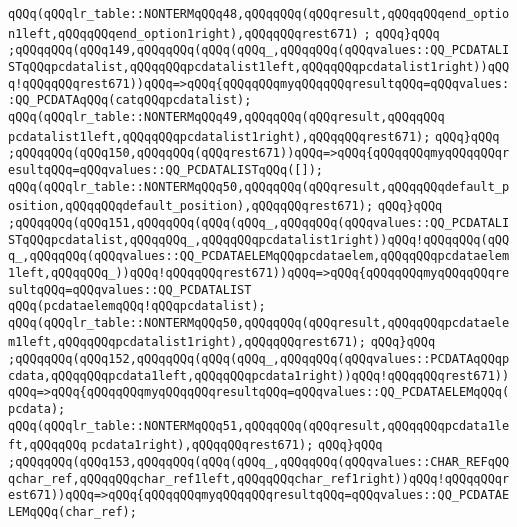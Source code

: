 \verb|qQQq(qQQqlr_table::NONTERMqQQq48,qQQqqQQq(qQQqresult,qQQqqQQqend_option1left,qQQqqQQqend_option1right),qQQqqQQqrest671)|\newline
\verb|;|\newline
\verb|qQQq}qQQq|\newline
\verb|;qQQqqQQq(qQQq149,qQQqqQQq(qQQq(qQQq_,qQQqqQQq(qQQqvalues::QQ_PCDATALISTqQQqpcdatalist,qQQqqQQqpcdatalist1left,qQQqqQQqpcdatalist1right))qQQq!qQQqqQQqrest671))qQQq=>qQQq{qQQqqQQqmyqQQqqQQqresultqQQq=qQQqvalues::QQ_PCDATAqQQq(catqQQqpcdatalist);|\newline
\verb|qQQq(qQQqlr_table::NONTERMqQQq49,qQQqqQQq(qQQqresult,qQQqqQQq|\newline
\verb|pcdatalist1left,qQQqqQQqpcdatalist1right),qQQqqQQqrest671);|\newline
\verb|qQQq}qQQq|\newline
\verb|;qQQqqQQq(qQQq150,qQQqqQQq(qQQqrest671))qQQq=>qQQq{qQQqqQQqmyqQQqqQQqresultqQQq=qQQqvalues::QQ_PCDATALISTqQQq([]);|\newline
\verb|qQQq(qQQqlr_table::NONTERMqQQq50,qQQqqQQq(qQQqresult,qQQqqQQqdefault_position,qQQqqQQqdefault_position),qQQqqQQqrest671);|\newline
\verb|qQQq}qQQq|\newline
\verb|;qQQqqQQq(qQQq151,qQQqqQQq(qQQq(qQQq_,qQQqqQQq(qQQqvalues::QQ_PCDATALISTqQQqpcdatalist,qQQqqQQq_,qQQqqQQqpcdatalist1right))qQQq!qQQqqQQq(qQQq_,qQQqqQQq(qQQqvalues::QQ_PCDATAELEMqQQqpcdataelem,qQQqqQQqpcdataelem1left,qQQqqQQq_))qQQq!qQQqqQQqrest671))qQQq=>qQQq{qQQqqQQqmyqQQqqQQqresultqQQq=qQQqvalues::QQ_PCDATALIST|\newline
\verb|qQQq(pcdataelemqQQq!qQQqpcdatalist);|\newline
\verb|qQQq(qQQqlr_table::NONTERMqQQq50,qQQqqQQq(qQQqresult,qQQqqQQqpcdataelem1left,qQQqqQQqpcdatalist1right),qQQqqQQqrest671);|\newline
\verb|qQQq}qQQq|\newline
\verb|;qQQqqQQq(qQQq152,qQQqqQQq(qQQq(qQQq_,qQQqqQQq(qQQqvalues::PCDATAqQQqpcdata,qQQqqQQqpcdata1left,qQQqqQQqpcdata1right))qQQq!qQQqqQQqrest671))qQQq=>qQQq{qQQqqQQqmyqQQqqQQqresultqQQq=qQQqvalues::QQ_PCDATAELEMqQQq(pcdata);|\newline
\verb|qQQq(qQQqlr_table::NONTERMqQQq51,qQQqqQQq(qQQqresult,qQQqqQQqpcdata1left,qQQqqQQq|\newline
\verb|pcdata1right),qQQqqQQqrest671);|\newline
\verb|qQQq}qQQq|\newline
\verb|;qQQqqQQq(qQQq153,qQQqqQQq(qQQq(qQQq_,qQQqqQQq(qQQqvalues::CHAR_REFqQQqchar_ref,qQQqqQQqchar_ref1left,qQQqqQQqchar_ref1right))qQQq!qQQqqQQqrest671))qQQq=>qQQq{qQQqqQQqmyqQQqqQQqresultqQQq=qQQqvalues::QQ_PCDATAELEMqQQq(char_ref);|\newline
